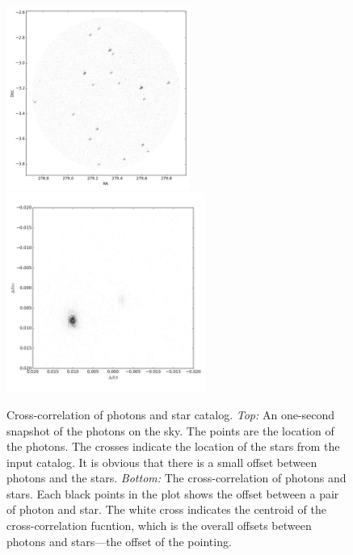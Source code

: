\documentclass[12pt, preprint]{aastex}
\begin{document}
\begin{figure}[p]
\begin{center}
\includegraphics[width=0.535\textwidth]{figures/photons600}
\includegraphics[width=0.58\textwidth]{figures/co600}
\end{center}
\caption{%
  \label{slice}
  Cross-correlation of photons and star catalog.
  \emph{Top:}  An one-second snapshot of the photons on the sky. The points are the location of the photons. The crosses indicate the location of the stars from the input catalog. It is obvious that there is a small offset between photons and the stars.
  \emph{Bottom:} The cross-correlation of photons and stars. 
  Each black points in the plot shows the offset between a pair of photon and star. 
  The white cross indicates the centroid of the cross-correlation fucntion, which is the overall offsets between photons and stars---the offset of the pointing.
  }
\end{figure}
\end{document}
